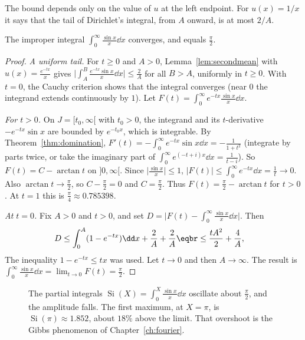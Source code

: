 The bound depends only on the value of $u$ at the left endpoint. For $u(x)=1/x$ it says that the tail of Dirichlet's integral, from $A$ onward, is at most $2/A$.

\begin{theorem}[Dirichlet]\label{thm:dirichletint}
The improper integral $\int_0^\infty\frac{\sin x}x\dd x$ converges, and equals $\frac\pi2$.
\end{theorem}
\begin{proof}
\emph{A uniform tail.}
For $t\ge0$ and $A>0$, Lemma~\ref{lem:secondmean} with $u(x)=\frac{e^{-tx}}x$ gives $\bigl|\int_A^B\frac{e^{-tx}\sin x}x\dd x\bigr|\le\frac2A$
for all $B>A$, uniformly in $t\ge0$. With $t=0$, the Cauchy criterion shows that the integral converges (near $0$ the integrand
extends continuously by $1$). Let $F(t)=\int_0^\infty e^{-tx}\frac{\sin x}x\dd x$.

\emph{For $t>0$.} On $J=[t_0,\infty[$ with $t_0>0$, the integrand and its $t$-derivative $-e^{-tx}\sin x$ are bounded by $e^{-t_0x}$,
which is integrable. By Theorem~\ref{thm:domination}, $F'(t)=-\int_0^\infty e^{-tx}\sin x\dd x=-\frac1{1+t^2}$ (integrate by parts twice, or take
the imaginary part of $\int_0^\infty e^{(-t+i)x}\dd x=\frac1{t-i}$). So $F(t)=C-\arctan t$ on $]0,\infty[$. Since $\bigl|\frac{\sin x}x\bigr|\le1$,
$|F(t)|\le\int_0^\infty e^{-tx}\dd x=\frac1t\to0$. Also $\arctan t\to\frac\pi2$, so $C-\frac\pi2=0$ and $C=\frac\pi2$. Thus $F(t)=\frac\pi2-\arctan t$ for $t>0$. At $t=1$ this is $\frac\pi4\approx0.785398$.

\emph{At $t=0$.} Fix $A>0$ and $t>0$, and set $D=\bigl|F(t)-\int_0^\infty\frac{\sin x}x\dd x\bigr|$. Then
\[
\begin{aligned}D&\le\int_0^A(1-e^{-tx})\dd x+\frac2A+\frac2A\eqbr\le\frac{tA^2}2+\frac4A,\end{aligned}
\]
The inequality $1-e^{-tx}\le tx$ was used. Let $t\to0$ and then $A\to\infty$. The result is $\int_0^\infty\frac{\sin x}x\dd x=\lim_{t\to0}F(t)=\frac\pi2$.
\end{proof}

\begin{figure}[ht]
\centering
{}
\caption{The partial integrals $\operatorname{Si}(X)=\int_0^X\frac{\sin x}x\dd x$ oscillate about $\frac\pi2$, and the amplitude falls. The
first maximum, at $X=\pi$, is $\operatorname{Si}(\pi)\approx1.852$, about $18\%$ above the limit. That overshoot is the Gibbs phenomenon
of Chapter~\ref{ch:fourier}.}
\label{fig:si}
\end{figure}

